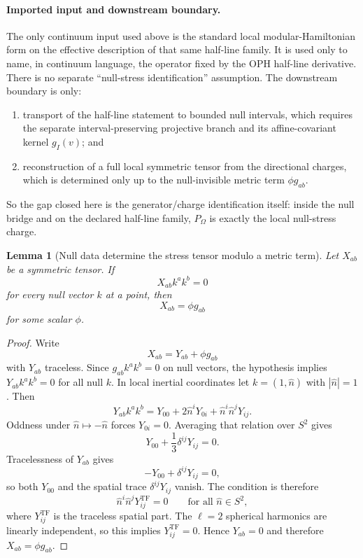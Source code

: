 \documentclass[11pt]{article}
\newtheorem{lemma}[theorem]{Lemma}
\begin{document}
\paragraph{Imported input and downstream boundary.}
The only continuum input used above is the standard local modular-Hamiltonian form on the effective description of that same half-line family. It is used only to name, in continuum language, the operator fixed by the OPH half-line derivative. There is no separate ``null-stress identification'' assumption. The downstream boundary is only:
\begin{enumerate}[label=(\roman*),leftmargin=2.2em]
\item transport of the half-line statement to bounded null intervals, which requires the separate interval-preserving projective branch and its affine-covariant kernel \(g_I(v)\); and
\item reconstruction of a full local symmetric tensor from the directional charges, which is determined only up to the null-invisible metric term \(\phi g_{ab}\).
\end{enumerate}
So the gap closed here is the generator/charge identification itself: inside the null bridge and on the declared half-line family, \(P_\Omega\) is exactly the local null-stress charge.

\begin{lemma}[Null data determine the stress tensor modulo a metric term]\label{lem:nullreconstruct}
Let \(X_{ab}\) be a symmetric tensor. If
\[
X_{ab}k^ak^b=0
\]
for every null vector \(k\) at a point, then
\[
X_{ab}=\phi g_{ab}
\]
for some scalar \(\phi\).
\end{lemma}

\begin{proof}
Write
\[
X_{ab}=Y_{ab}+\phi g_{ab}
\]
with \(Y_{ab}\) traceless. Since \(g_{ab}k^ak^b=0\) on null vectors, the hypothesis implies \(Y_{ab}k^ak^b=0\) for all null \(k\). In local inertial coordinates let \(k=(1,\hat n)\) with \(|\hat n|=1\). Then
\[
Y_{ab}k^ak^b
=
Y_{00}+2\hat n^iY_{0i}+\hat n^i\hat n^jY_{ij}.
\]
Oddness under \(\hat n\mapsto-\hat n\) forces \(Y_{0i}=0\). Averaging that relation over \(S^2\) gives
\[
Y_{00}+\frac13\delta^{ij}Y_{ij}=0.
\]
Tracelessness of \(Y_{ab}\) gives
\[
-Y_{00}+\delta^{ij}Y_{ij}=0,
\]
so both \(Y_{00}\) and the spatial trace \(\delta^{ij}Y_{ij}\) vanish. The condition is therefore
\[
\hat n^i\hat n^j Y_{ij}^{\mathrm{TF}}=0
\qquad
\text{for all }\hat n\in S^2,
\]
where \(Y_{ij}^{\mathrm{TF}}\) is the traceless spatial part. The \(\ell=2\) spherical harmonics are linearly independent, so this implies \(Y_{ij}^{\mathrm{TF}}=0\). Hence \(Y_{ab}=0\) and therefore \(X_{ab}=\phi g_{ab}\).
\end{proof}
\end{document}
